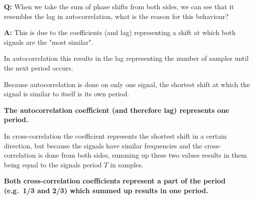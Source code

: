 \documentclass[a4paper, 11pt]{article}
\begin{document}
\begin{enumerate}
        \vspace{6mm}

        \textbf{Q:} When we take the sum of phase shifts from both sides,
        we can see that it resembles the lag in autocorrelation,
        what is the reason for this behaviour?

        \textbf{A:} This is due to the coefficients (and lag) representing a shift at which both signals are the "most similar".

        In autocorrelation this results in the lag representing the number of samples until the next period occurs.

        Because autocorrelation is done on only one signal,
        the shortest shift at which the signal is similar to itself is its own period.

        \textbf{The autocorrelation coefficient (and therefore lag) represents one period.}

        In cross-correlation the coefficient represents the shortest shift in a certain direction,
        but because the signals have similar frequencies and the cross-correlation is done from both sides,
        summing up these two values results in them
        being equal to the signals period $T$ in samples.

        \textbf{Both cross-correlation coefficients represent a part of the period (e.g.\ 1/3 and 2/3)
        which summed up results in one period.}
    \end{enumerate}
\end{document}
